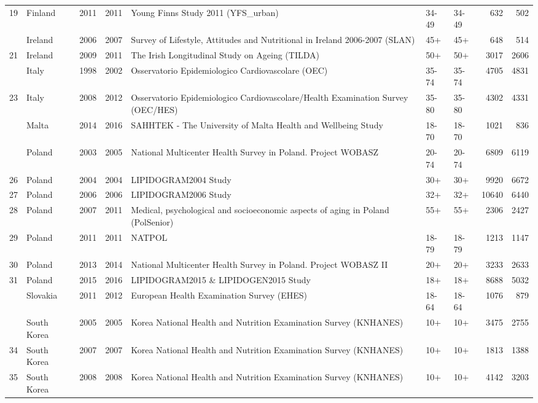 \begin{longtable}[t]{rlrrlllrr}
19 & Finland & 2011 & 2011 & Young Finns Study 2011 (YFS\_urban) & 34-49 & 34-49 & 632 & 502\\
\addlinespace
20 & Ireland & 2006 & 2007 & Survey of Lifestyle, Attitudes and Nutritional in Ireland 2006-2007 (SLAN) & 45+ & 45+ & 648 & 514\\
21 & Ireland & 2009 & 2011 & The Irish Longitudinal Study on Ageing (TILDA) & 50+ & 50+ & 3017 & 2606\\
\addlinespace
22 & Italy & 1998 & 2002 & Osservatorio Epidemiologico Cardiovascolare (OEC) & 35-74 & 35-74 & 4705 & 4831\\
23 & Italy & 2008 & 2012 & Osservatorio Epidemiologico Cardiovascolare/Health Examination Survey (OEC/HES) & 35-80 & 35-80 & 4302 & 4331\\
\addlinespace
24 & Malta & 2014 & 2016 & SAHHTEK - The University of Malta Health and Wellbeing Study & 18-70 & 18-70 & 1021 & 836\\
\addlinespace
25 & Poland & 2003 & 2005 & National Multicenter Health Survey in Poland. Project WOBASZ & 20-74 & 20-74 & 6809 & 6119\\
26 & Poland & 2004 & 2004 & LIPIDOGRAM2004 Study & 30+ & 30+ & 9920 & 6672\\
27 & Poland & 2006 & 2006 & LIPIDOGRAM2006 Study & 32+ & 32+ & 10640 & 6440\\
28 & Poland & 2007 & 2011 & Medical, psychological and socioeconomic aspects of aging in Poland (PolSenior) & 55+ & 55+ & 2306 & 2427\\
29 & Poland & 2011 & 2011 & NATPOL & 18-79 & 18-79 & 1213 & 1147\\
30 & Poland & 2013 & 2014 & National Multicenter Health Survey in Poland. Project WOBASZ II & 20+ & 20+ & 3233 & 2633\\
31 & Poland & 2015 & 2016 & LIPIDOGRAM2015 \& LIPIDOGEN2015 Study & 18+ & 18+ & 8688 & 5032\\
\addlinespace
32 & Slovakia & 2011 & 2012 & European Health Examination Survey (EHES) & 18-64 & 18-64 & 1076 & 879\\
\addlinespace
33 & South Korea & 2005 & 2005 & Korea National Health and Nutrition Examination Survey (KNHANES) & 10+ & 10+ & 3475 & 2755\\
34 & South Korea & 2007 & 2007 & Korea National Health and Nutrition Examination Survey (KNHANES) & 10+ & 10+ & 1813 & 1388\\
35 & South Korea & 2008 & 2008 & Korea National Health and Nutrition Examination Survey (KNHANES) & 10+ & 10+ & 4142 & 3203\\

\end{longtable}
